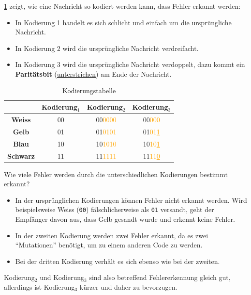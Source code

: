 \begin{myexample}\label{ex:code-kerk}
\cref{tab:codes} zeigt, wie eine Nachricht so kodiert werden kann, dass Fehler erkannt werden:
\begin{itemize}
    \item In Kodierung 1 handelt es sich schlicht und einfach um die ursprüngliche Nachricht.
    \item In Kodierung 2 wird die ursprüngliche Nachricht verdreifacht.
    \item In Kodierung 3 wird die ursprüngliche Nachricht verdoppelt, dazu kommt ein \textbf{Paritätsbit} (\underline{unterstrichen}) am Ende der Nachricht.
\end{itemize}
\begin{table}[H]
    \centering
    \begin{tabular}{c|c|c|c}
                         & \textbf{Kodierung$_1$} & \textbf{Kodierung$_2$}     & \textbf{Kodierung$_3$}                \\
        \midrule\midrule
        \textbf{Weiss}   & 00                     & 00\textcolor{orange}{0000} & 00\textcolor{orange}{00\underline{0}} \\
        \midrule
        \textbf{Gelb}    & 01                     & 01\textcolor{orange}{0101} & 01\textcolor{orange}{01\underline{1}} \\
        \midrule
        \textbf{Blau}    & 10                     & 10\textcolor{orange}{1010} & 10\textcolor{orange}{10\underline{1}} \\
        \midrule
        \textbf{Schwarz} & 11                     & 11\textcolor{orange}{1111} & 11\textcolor{orange}{11\underline{0}} \\
    \end{tabular}
    \caption{Kodierungstabelle}
    \label{tab:codes}
\end{table}

Wie viele Fehler werden durch die unterschiedlichen Kodierungen bestimmt erkannt?
\begin{itemize}
    \item In der ursprünglichen Kodierungen können Fehler nicht erkannt werden. Wird beispielsweise Weiss (\texttt{00}) fälschlicherweise als \texttt{01} versandt, geht der Empfänger davon aus, dass Gelb gesandt wurde und erkennt keine Fehler.
    \item In der zweiten Kodierung werden zwei Fehler erkannt, da es zwei \enquote{Mutationen} benötigt, um zu einem anderen Code zu werden.
    \item Bei der dritten Kodierung verhält es sich ebenso wie bei der zweiten.
\end{itemize}
Kodierung$_2$ und Kodierung$_3$ sind also betreffend Fehlererkennung gleich gut, allerdings ist Kodierung$_3$ kürzer und daher zu bevorzugen.
\end{myexample}

